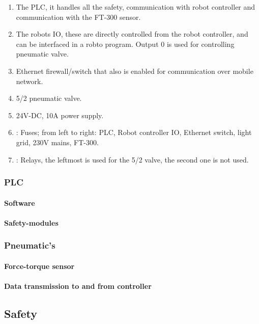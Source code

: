\documentclass{article}
\begin{document}
        \begin{enumerate}
        
            \item The PLC, it handles all the safety, communication with robot controller and communication with the FT-300 sensor. 
            \item The robots IO, these are directly controlled from the robot controller, and can be interfaced in a robto program. Output 0 is used for controlling pneumatic valve.
            \item Ethernet firewall/switch that also is enabled for communication over mobile network.
            \item 5/2 pneumatic valve.
            \item 24V-DC, 10A power supply.
            \item: Fuses; from left to right: PLC, Robot controller IO, Ethernet switch, light grid, 230V mains, FT-300. 
            \item: Relays, the leftmost is used for the 5/2 valve, the second one is not used.
        \end{enumerate}
        
        \newpage
        
        \subsubsection{PLC}
        \paragraph{Software}
        \paragraph{Safety-modules}
        \subsubsection{Pneumatic's}
        \paragraph{Force-torque sensor}
        \paragraph{Data transmission to and from controller}

\newpage

    \subsection{Safety}
\end{document}
